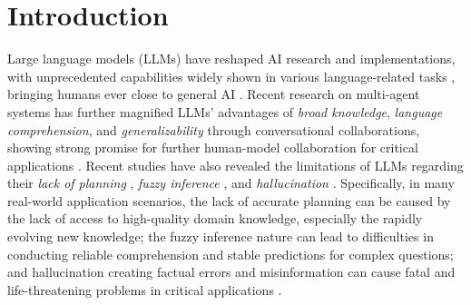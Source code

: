 \section{Introduction}

Large language models (LLMs) have reshaped AI research and implementations, with unprecedented capabilities widely shown in various language-related tasks \cite{achiam2023gpt, leiter2024chatgpt, reid2024gemini, adler2024nemotron, jiang2023mistral, touvron2023llama, team2024gemma}, bringing humans ever close to general AI \cite{brown2020language, bubeck2023sparks, ge2024openagi}.
Recent research on multi-agent systems has further magnified LLMs' advantages of {\textit{broad knowledge}, \textit{language comprehension}, and \textit{generalizability}} through conversational collaborations, showing strong promise for further human-model collaboration for critical applications \cite{bankes2002agent, bai2022constitutional, bonabeau2002agent, li2023camel, wu2024autogen}.
Recent studies have also revealed the limitations of LLMs regarding their {\textit{lack of planning} \cite{hu2023large, mousavi2024your, yadkori2024believe, asai2024selfrag,yu2024rankrag}, \textit{fuzzy inference} \cite{liu2023evaluating, zhu2023dyval, zhuo2024roles, yuan2024back, wang2023boosting}, and \textit{hallucination} \cite{ji2023survey, bai2024hallucination, tonmoy2024comprehensive, maynez2020faithfulness, xiao2021hallucination, farquhar2024detecting, ji2023towards, chen2024inside}}. Specifically, in many real-world application scenarios, the lack of accurate planning can be caused by the lack of access to high-quality domain knowledge, especially the rapidly evolving new knowledge; the fuzzy inference nature can lead to difficulties in conducting reliable comprehension and stable predictions for complex questions; and hallucination creating factual errors and misinformation can cause fatal and life-threatening problems in critical applications \cite{wornow2023shaky, shen2023chatgpt, pal2023med, xu2024simrag, panagoulias2024evaluating, gu2024medvh}.

